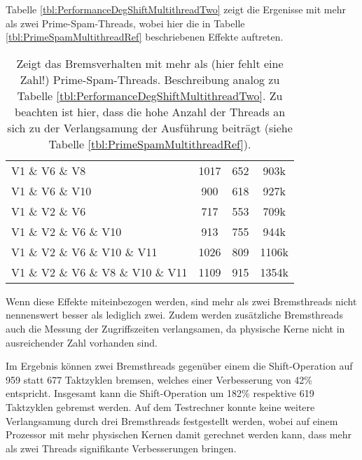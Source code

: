 Tabelle \ref{tbl:PerformanceDegShiftMultithreadTwo} zeigt die Ergenisse mit mehr als zwei Prime-Spam-Threads, wobei hier die in Tabelle \ref{tbl:PrimeSpamMultithreadRef} beschriebenen Effekte auftreten.

\begin{table}[h]
\caption{Zeigt das Bremsverhalten mit mehr als (hier fehlt eine Zahl!) Prime-Spam-Threads. Beschreibung analog zu Tabelle \ref{tbl:PerformanceDegShiftMultithreadTwo}. Zu beachten ist hier, dass die hohe Anzahl der Threads an sich zu der Verlangsamung der Ausführung beiträgt (siehe Tabelle \ref{tbl:PrimeSpamMultithreadRef}).}
\label{tbl:PerformanceDegShiftMultithreadThreePlus}
\begin{tabular}{lccc}
V1 \& V6 \& V8                             & 1017  & 652 & 903k    \\
V1 \& V6 \& V10                            & 900   & 618 & 927k    \\
V1 \& V2 \& V6                             & 717   & 553 & 709k    \\
V1 \& V2 \& V6 \& V10                      & 913   & 755 & 944k    \\
V1 \& V2 \& V6 \& V10 \& V11               & 1026  & 809 & 1106k   \\
V1 \& V2 \& V6 \& V8 \& V10 \& V11         & 1109  & 915 & 1354k  
\end{tabular}
\end{table}

Wenn diese Effekte miteinbezogen werden, sind mehr als zwei Bremsthreads nicht nennenswert besser als lediglich zwei.
Zudem werden zusätzliche Bremsthreads auch die Messung der Zugriffszeiten verlangsamen, da physische Kerne nicht in ausreichender Zahl vorhanden sind.

Im Ergebnis können zwei Bremsthreads gegenüber einem die Shift-Operation auf 959 statt 677 Taktzyklen bremsen, welches einer Verbesserung von 42\% entspricht.
Insgesamt kann die Shift-Operation um 182\% respektive 619 Taktzyklen gebremst werden.
Auf dem Testrechner konnte keine weitere Verlangsamung durch drei Bremsthreads festgestellt werden, wobei auf einem Prozessor mit mehr physischen Kernen damit gerechnet werden kann, dass mehr als zwei Threads signifikante Verbesserungen bringen.


%




